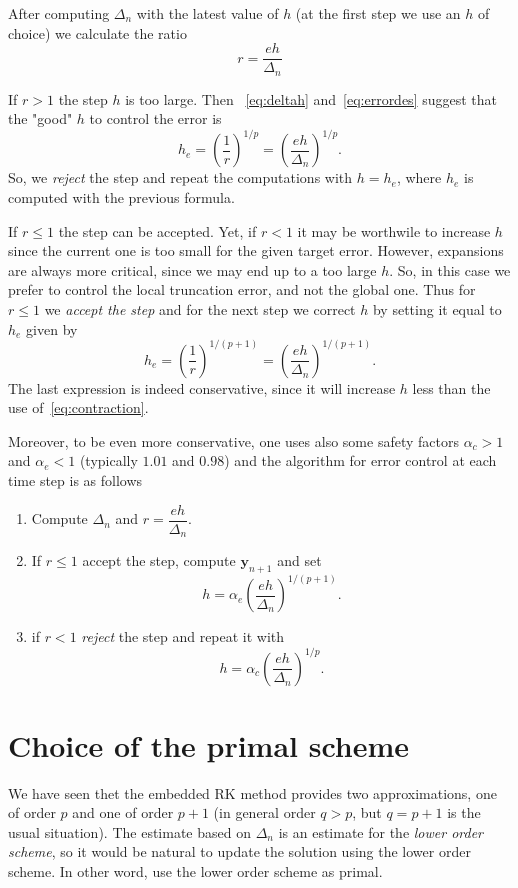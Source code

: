 \documentclass[10pt,a4paper,twoside]{article}
\begin{document}
After computing $\Delta_n$ with the latest value of $h$ (at the first step we use an $h$ of choice) we calculate the ratio
\[
r=\dfrac{eh}{\Delta_n}
\]

If $r>1$ the step $h$ is too large. Then ~\eqref{eq:deltah} and~\eqref{eq:errordes} suggest that the "good" $h$ to control the error is
\begin{equation}\label{eq:contraction}
h_e = \left(\dfrac{1}{r}\right)^{1/p}=\left(\dfrac{eh}{\Delta_n}\right)^{1/p}.
\end{equation}
So, we \emph{reject} the step and repeat the computations with $h=h_e$, where $h_e$ is computed with the previous formula.

If $r\le 1$ the step can be accepted. Yet, if $r<1$ it may be worthwile to increase $h$ since the current one is too small for the given target error. However, expansions are always more critical, since we may end up to a too large $h$. So, in this case we prefer to control the local truncation error, and not the global one. Thus for $r \le 1$ we \emph{accept the step} and for the next step we correct $h$ by setting it equal to $h_e$ given by
\begin{equation}\label{eq:expansion}
h_e = \left(\dfrac{1}{r}\right)^{1/(p+1)}=\left(\dfrac{eh}{\Delta_n}\right)^{1/(p+1)}.
\end{equation}
The last expression is indeed conservative, since it will increase $h$ less than the 
use of~\eqref{eq:contraction}.

Moreover, to be even more conservative, one uses also some safety factors $\alpha_c>1$ and $\alpha_e<1$ (typically $1.01$ and $0.98$) and the algorithm for error control at each time step is as follows
\begin{enumerate}
    \item Compute $\Delta_n$ and $r=\dfrac{eh}{\Delta_n}$.
    \item If $r\le 1$ accept the step, compute $\mathbf{y}_{n+1}$ and set
    \[
    h = \alpha_e\left(\dfrac{eh}{\Delta_n}\right)^{1/(p+1)}.
    \]
    \item if $r<1$ \emph{reject} the step and repeat it with
    \[
    h = \alpha_c\left(\dfrac{eh}{\Delta_n}\right)^{1/p}.
    \]
\end{enumerate}

\section{Choice of the primal scheme}
We have seen thet the embedded RK method provides two approximations, one of order $p$ and one of order $p+1$ (in general order $q>p$, but $q=p+1$ is the usual situation). The estimate based on $\Delta_n$ is an estimate for the \emph{lower order scheme}, so it would be natural to update
the solution using the lower order scheme. In other word, use the lower order scheme as primal.
\end{document}
